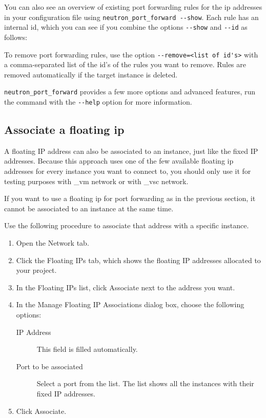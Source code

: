 You can also see an overview of existing port forwarding rules for the
ip addresses in your configuration file using
\lstinline{neutron_port_forward --show}.  Each rule has an internal
id, which you can see if you combine the options \lstinline{--show}
and \lstinline{--id} as follows:

\begin{prompt}
\end{prompt}

To remove port forwarding rules, use the option
\lstinline{--remove=<list of id's>} with a comma-separated list of the
id's of the rules you want to remove.  Rules are removed automatically
if the target instance is deleted.

\lstinline{neutron_port_forward} provides a few more options and
advanced features, run the command with the \lstinline{--help} option
for more information.

\subsection*{Associate a floating ip}
A floating IP address can also be associated to an instance, just like
the fixed IP addresses.  Because this approach uses one of the few
available floating ip addresses for every instance you want to connect
to, you should only use it for testing purposes with \_vm network or
with \_vsc network.

 If you want to use a floating ip for port forwarding as
in the previous section, it cannot be associated to an instance at the
same time.

Use the following procedure to associate that address with a specific
instance.

\begin{enumerate}
\item Open the Network tab.
\item Click the Floating IPs tab, which shows the floating IP
  addresses allocated to your project.
\item In the Floating IPs list, click Associate next to the address you want.
\item In the Manage Floating IP Associations dialog box, choose the
  following options:

  \begin{description}
  \item[IP Address] This field is filled automatically.
  \item[Port to be associated] Select a port from the list.  The list shows all the instances with their fixed IP addresses.
  \end{description}
\item Click Associate.
\end{enumerate}

